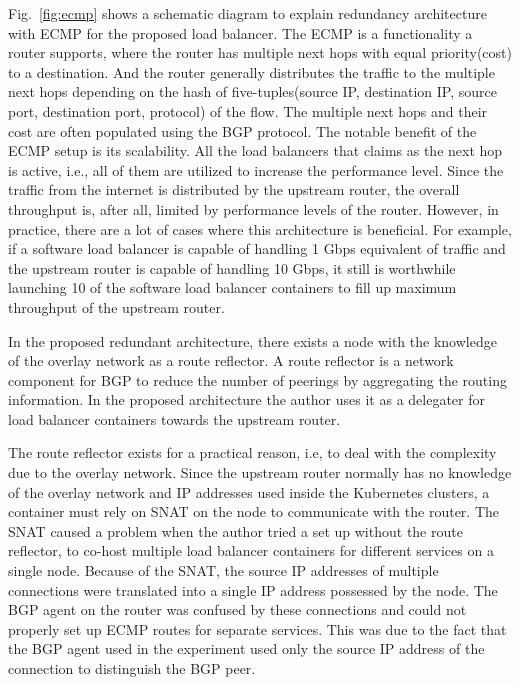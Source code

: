 Fig.~\ref{fig:ecmp} shows a schematic diagram to explain redundancy architecture with ECMP for the proposed load balancer.
%
The ECMP is a functionality a router supports, where the router has multiple next hops with equal priority(cost) to a destination.
And the router generally distributes the traffic to the multiple next hops depending on the hash of five-tuples(source IP, destination IP, source port, destination port, protocol) of the flow.
The multiple next hops and their cost are often populated using the BGP protocol.
%
The notable benefit of the ECMP setup is its scalability.
All the load balancers that claims as the next hop is active, i.e., all of them are utilized to increase the performance level.
Since the traffic from the internet is distributed by the upstream router, the overall throughput is, after all, limited by performance levels of the router.
However, in practice, there are a lot of cases where this architecture is beneficial.
For example, if a software load balancer is capable of handling 1 Gbps equivalent of traffic and the upstream router is capable of handling 10 Gbps, it still is worthwhile launching 10 of the software load balancer containers to fill up maximum throughput of the upstream router.

%
In the proposed redundant architecture, there exists a node with the knowledge of the overlay network as a route reflector.
A route reflector is a network component for BGP to reduce the number of peerings by aggregating the routing information\cite{rfc4456}.
In the proposed architecture the author uses it as a delegater for load balancer containers towards the upstream router.

The route reflector exists for a practical reason, i.e, to deal with the complexity due to the overlay network.
Since the upstream router normally has no knowledge of the overlay network and IP addresses used inside the Kubernetes clusters, a container must rely on SNAT on the node to communicate with the router.
The SNAT caused a problem when the author tried a set up without the route reflector, to co-host multiple load balancer containers for different services on a single node.
Because of the SNAT, the source IP addresses of multiple connections were translated into a single IP address possessed by the node.
The BGP agent on the router was confused by these connections and could not properly set up ECMP routes for separate services.
This was due to the fact that the BGP agent used in the experiment used only the source IP address of the connection to distinguish the BGP peer.

